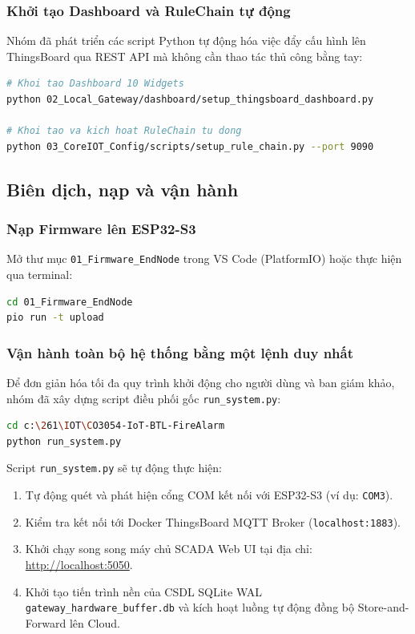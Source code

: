 \subsubsection{Khởi tạo Dashboard và RuleChain tự động}
Nhóm đã phát triển các script Python tự động hóa việc đẩy cấu hình lên ThingsBoard qua REST API mà không cần thao tác thủ công bằng tay:
\begin{lstlisting}[language=bash, style=mystyle]
# Khoi tao Dashboard 10 Widgets
python 02_Local_Gateway/dashboard/setup_thingsboard_dashboard.py

# Khoi tao va kich hoat RuleChain tu dong
python 03_CoreIOT_Config/scripts/setup_rule_chain.py --port 9090
\end{lstlisting}

\subsection{Biên dịch, nạp và vận hành}
\subsubsection{Nạp Firmware lên ESP32-S3}
Mở thư mục \texttt{01\_Firmware\_EndNode} trong VS Code (PlatformIO) hoặc thực hiện qua terminal:
\begin{lstlisting}[language=bash, style=mystyle]
cd 01_Firmware_EndNode
pio run -t upload
\end{lstlisting}

\subsubsection{Vận hành toàn bộ hệ thống bằng một lệnh duy nhất}
Để đơn giản hóa tối đa quy trình khởi động cho người dùng và ban giám khảo, nhóm đã xây dựng script điều phối gốc \texttt{run\_system.py}:
\begin{lstlisting}[language=bash, style=mystyle]
cd c:\261\IOT\CO3054-IoT-BTL-FireAlarm
python run_system.py
\end{lstlisting}

Script \texttt{run\_system.py} sẽ tự động thực hiện:
\begin{enumerate}
    \item Tự động quét và phát hiện cổng COM kết nối với ESP32-S3 (ví dụ: \texttt{COM3}).
    \item Kiểm tra kết nối tới Docker ThingsBoard MQTT Broker (\texttt{localhost:1883}).
    \item Khởi chạy song song máy chủ SCADA Web UI tại địa chỉ: \url{http://localhost:5050}.
    \item Khởi tạo tiến trình nền của CSDL SQLite WAL \texttt{gateway\_hardware\_buffer.db} và kích hoạt luồng tự động đồng bộ Store-and-Forward lên Cloud.
\end{enumerate}


